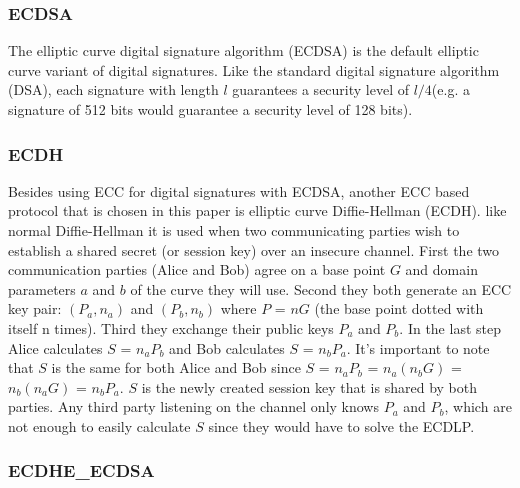 \subsubsection{ECDSA} 
\label{subsubsec:ecdsa}

The elliptic curve digital signature algorithm (ECDSA) is the default elliptic curve variant of digital signatures. Like the standard digital signature algorithm (DSA), each signature with length $l$ guarantees a security level of $l/4$(e.g. a signature of 512 bits would guarantee a security level of 128 bits).

\subsubsection{ECDH} 
\label{subsubsec:ecdh}

Besides using ECC for digital signatures with ECDSA, another ECC based protocol that is chosen in this paper is elliptic curve Diffie-Hellman (ECDH). like normal Diffie-Hellman it is used when two communicating parties wish to establish a shared secret (or session key) over an insecure channel. First the two communication parties (Alice and Bob) agree on a base point $G$ and domain parameters $a$ and $b$ of the curve they will use. Second they both generate an ECC key pair: $(P_a,n_a)$ and $(P_b,n_b)$ where $P$ = $nG$ (the base point dotted with itself n times). Third they exchange their public keys $P_a$ and $P_b$. In the last step Alice calculates $S$ = $n_a P_b$ and Bob calculates $S$ = $n_b P_a$. It's important to note that $S$ is the same for both Alice and Bob since $S$ = $n_a P_b$ = $n_a ( n_b G )$ = $n_b ( n_a G )$ = $n_b P_a$. $S$ is the newly created session key that is shared by both parties. Any third party listening on the channel only knows $P_a$ and $P_b$, which are not enough to easily calculate $S$ since they would have to solve the ECDLP.

\subsubsection{ECDHE\_ECDSA} 
\label{subsubsec:ecdh_ecdsa}

